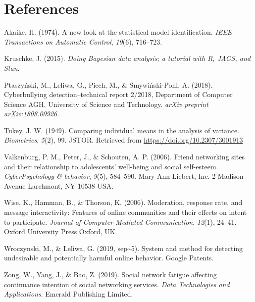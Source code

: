 \documentclass[10pt,]{scrartcl}
\begin{document}
\newpage

\section*{References}

\hypertarget{refs}{}
\hypertarget{ref-Akaike1974model}{}
Akaike, H. (1974). A new look at the statistical model identification.
\emph{IEEE Transactions on Automatic Control}, \emph{19}(6), 716--723.

\hypertarget{ref-Kruschke2015}{}
Kruschke, J. (2015). \emph{Doing Bayesian data analysis; a tutorial with
R, JAGS, and Stan}.

\hypertarget{ref-ptaszynski2018cyberbullying}{}
Ptaszyński, M., Leliwa, G., Piech, M., \& Smywiński-Pohl, A. (2018).
Cyberbullying detection--technical report 2/2018, Department of Computer
Science AGH, University of Science and Technology. \emph{arXiv preprint
arXiv:1808.00926}.

\hypertarget{ref-Tukey1949}{}
Tukey, J. W. (1949). Comparing individual means in the analysis of
variance. \emph{Biometrics}, \emph{5}(2), 99. JSTOR. Retrieved from
\url{https://doi.org/10.2307/3001913}

\hypertarget{ref-valkenburg2006friend}{}
Valkenburg, P. M., Peter, J., \& Schouten, A. P. (2006). Friend
networking sites and their relationship to adolescents' well-being and
social self-esteem. \emph{CyberPsychology \& behavior}, \emph{9}(5),
584--590. Mary Ann Liebert, Inc. 2 Madison Avenue Larchmont, NY 10538
USA.

\hypertarget{ref-wise2006moderation}{}
Wise, K., Hamman, B., \& Thorson, K. (2006). Moderation, response rate,
and message interactivity: Features of online communities and their
effects on intent to participate. \emph{Journal of Computer-Mediated
Communication}, \emph{12}(1), 24--41. Oxford University Press Oxford,
UK.

\hypertarget{ref-wroczynski2019system}{}
Wroczynski, M., \& Leliwa, G. (2019, sep\textasciitilde{}5). System and
method for detecting undesirable and potentially harmful online
behavior. Google Patents.

\hypertarget{ref-zong2019social}{}
Zong, W., Yang, J., \& Bao, Z. (2019). Social network fatigue affecting
continuance intention of social networking services. \emph{Data
Technologies and Applications}. Emerald Publishing Limited.
\end{document}
